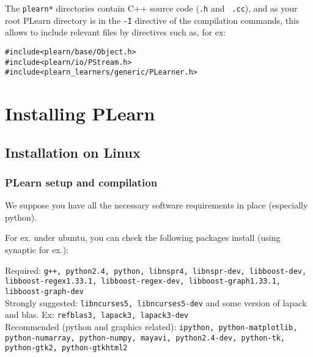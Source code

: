 \documentclass[11pt]{book}
\begin{document}
The \verb!plearn*! directories contain C++ source code ({\tt .h} and {\tt
  .cc}), and as your root PLearn directory is in the \verb!-I! directive of
the compilation commands, this allows to include relevant files by
directives such as, for ex:
\begin{verbatim}
#include<plearn/base/Object.h>
#include<plearn/io/PStream.h>
#include<plearn_learners/generic/PLearner.h>
\end{verbatim}



\chapter{Installing PLearn}

\section{Installation on Linux}

\subsection{PLearn setup and compilation}

We suppose you have all the necessary software requirements in place (especially python).

For ex. under ubuntu, you can check the following packages install (using
synaptic for ex.):

Required:
{\tt g++, python2.4, python, libnspr4, libnspr-dev, libboost-dev,
libboost-regex1.33.1, libboost-regex-dev, libboost-graph1.33.1, libboost-graph-dev} \\
Strongly suggested: \verb!libncurses5, libncurses5-dev! and some version of lapack and blas. Ex:
{\tt refblas3, lapack3, lapack3-dev} \\
Recommended (python and graphics related):
{\tt ipython, python-matplotlib, 
python-numarray, python-numpy, mayavi, python2.4-dev,
python-tk, python-gtk2, python-gtkhtml2} \\
\end{document}
